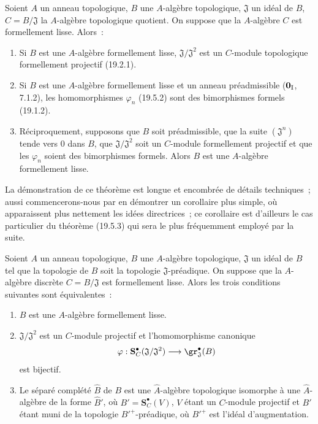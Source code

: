 \begin{theorem}[19.5.3]
\label{0.19.5.3-fr}
Soient $A$ un anneau topologique, $B$ une $A$-algèbre topologique,
$\mathfrak J$ un idéal de $B$, $C=B/\mathfrak J$ la $A$-algèbre topologique
quotient. On suppose que la $A$-algèbre $C$ est formellement lisse.
Alors~:
\begin{enumerate}
  \item[\rm(i)] Si $B$ est une $A$-algèbre formellement lisse,
  $\mathfrak J/\mathfrak J^2$ est un $C$-module topologique formellement
  projectif \textup{(19.2.1)}.
  \item[\rm(ii)] Si $B$ est une $A$-algèbre formellement lisse et un anneau
  préadmissible \textup{($\mathbf 0_{\rm I}$, 7.1.2)}, les homomorphismes $\varphi_n$
  \textup{(19.5.2)} sont des bimorphismes formels \textup{(19.1.2)}.
  \item[\rm(iii)] Réciproquement, supposons que $B$ soit préadmissible, que la
  suite $(\mathfrak J^n)$ tende vers $0$ dans $B$, que
  $\mathfrak J/\mathfrak J^2$ soit un $C$-module formellement projectif et que
  les $\varphi_n$ soient des bimorphismes formels. Alors $B$ est une
  $A$-algèbre formellement lisse.
\end{enumerate}
\end{theorem}

La démonstration de ce théorème est longue et encombrée de détails techniques~;
aussi commencerons-nous par en démontrer un corollaire plus simple, où
apparaissent plus nettement les idées directrices~; ce corollaire est d'ailleurs
le cas particulier du théorème (19.5.3) qui sera le plus fréquemment employé
par la suite.

\begin{corollary}[19.5.4.]
\label{0.19.5.4-fr}
Soient $A$ un anneau topologique, $B$ une $A$-algèbre topologique,
$\mathfrak J$ un idéal de $B$ tel que la topologie de $B$ soit la topologie
$\mathfrak J$-préadique. On suppose que la $A$-algèbre discrète
$C=B/\mathfrak J$ est formellement lisse. Alors les trois conditions suivantes
sont équivalentes~:
\begin{enumerate}
  \item[\textup{a)}] $B$ est une $A$-algèbre formellement lisse.
  \item[\textup{b)}] $\mathfrak J/\mathfrak J^2$ est un $C$-module projectif et
  l'homomorphisme canonique
  \[
    \varphi:\mathbf S_C^\bullet(\mathfrak J/\mathfrak J^2)
    \longrightarrow\gr_{\mathfrak J}^\bullet(B)
  \]
  est bijectif.
  \item[\textup{c)}] Le séparé complété $\widehat B$ de $B$ est une
  $\widehat A$-algèbre topologique isomorphe à une $\widehat A$-algèbre de la
  forme $\widehat{B}'$, où $B'=\mathbf S_C^\bullet(V)$, $V$ étant un $C$-module
  projectif et $B'$ étant muni de la topologie ${B'}^+$-préadique, où
  ${B'}^+$ est l'idéal d'augmentation.
\end{enumerate}
\end{corollary}

